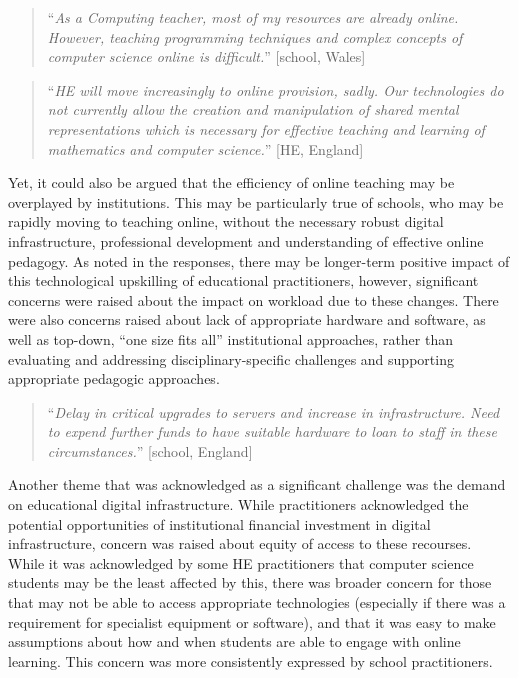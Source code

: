 \documentclass[sigconf]{acmart}
\begin{document}

\begin{quotation}
``{\emph{As a Computing teacher, most of my resources are already
online. However, teaching programming techniques and complex concepts
of computer science online is difficult.}}'' [school, Wales]
\end{quotation}

\begin{quotation}
``{\emph{HE will move increasingly to online provision, sadly. Our
technologies do not currently allow the creation and manipulation of
shared mental representations which is necessary for effective
teaching and learning of mathematics and computer science.}}'' [HE, England]
\end{quotation}

Yet, it could also be argued that the efficiency of online teaching
may be overplayed by institutions. This may be particularly true of
schools, who may be rapidly moving to teaching online, without the
necessary robust digital infrastructure, professional development and
understanding of effective online pedagogy. As noted in the responses,
there may be longer-term positive impact of this technological
upskilling of educational practitioners, however, significant concerns
were raised about the impact on workload due to these changes. There
were also concerns raised about lack of appropriate hardware and
software, as well as top-down, ``one size fits all'' institutional
approaches, rather than evaluating and addressing
disciplinary-specific challenges and supporting appropriate pedagogic
approaches.

\begin{quotation}
``{\emph{Delay in critical upgrades to servers and increase in
infrastructure.  Need to expend further funds to have suitable
hardware to loan to staff in these circumstances.}}'' [school, England]
\end{quotation}

Another theme that was acknowledged as a significant challenge was the
demand on educational digital infrastructure. While practitioners
acknowledged the potential opportunities of institutional financial
investment in digital infrastructure, concern was raised about equity
of access to these recourses. While it was acknowledged by some HE
practitioners that computer science students may be the least affected
by this, there was broader concern for those that may not be able to
access appropriate technologies (especially if there was a requirement
for specialist equipment or software), and that it was easy to make
assumptions about how and when students are able to engage with online
learning. This concern was more consistently expressed by school
practitioners.
\end{document}
